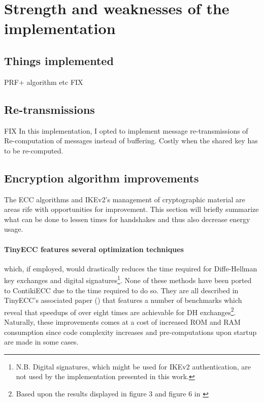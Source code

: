 \documentclass[final,a4paper,twoside,11pt,onecolumn]{report}
\begin{document}
\section{Strength and weaknesses of the implementation}

\subsection{Things implemented}
PRF+ algorithm etc FIX


\subsection{Re-transmissions}
FIX
In this implementation, I opted to implement message re-transmissions of 
Re-computation of messages instead of buffering. Costly when the shared key has to be re-computed.



\subsection{Encryption algorithm improvements}
\label{sec:ecc-improvements}
The ECC algorithms and IKEv2's management of cryptographic material are areas rife with opportunities for improvement. This section will briefly summarize what can be done to lessen times for handshakes and thus also decrease energy usage.

\paragraph{TinyECC features several optimization techniques} which, if employed, would drastically reduces the time required for Diffe-Hellman key exchanges and digital signatures\footnote{N.B. Digital signatures, which might be used for IKEv2 authentication, are not used by the implementation presented in this work.}. None of these methods have been ported to ContikiECC due to the time required to do so. They are all described in TinyECC's associated paper (\cite{liu2008tinyecc}) that features a number of benchmarks which reveal that speedups of over eight times are achievable for DH exchanges\footnote{Based upon the results displayed in figure 3 and figure 6 in \cite{liu2008tinyecc}}. Naturally, these improvements comes at a cost of increased ROM and RAM consumption since code complexity increases and pre-computations upon startup are made in some cases.
\end{document}
